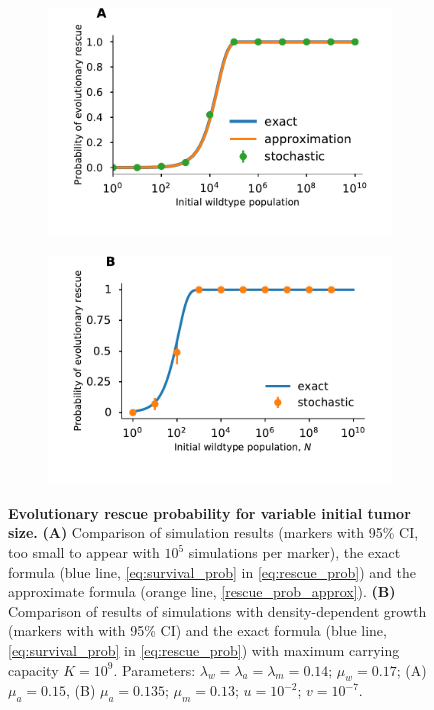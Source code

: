 \documentclass[12pt]{extarticle}
\begin{document}

\begin{figure}
\begin{subfigure}{0.5\textwidth}
\includegraphics[width=1\textwidth]{Figures/DeleteriousTauLeapPlot.pdf}
\end{subfigure}
\begin{subfigure}{0.5\textwidth}
\includegraphics[width=1\textwidth]{Figures/SurvPlotNDataLogisticK.pdf}
\end{subfigure}
\caption{\textbf{Evolutionary rescue probability for variable initial tumor size.}
\textbf{(A)} Comparison of simulation results (markers with 95\% CI, too small to appear with $10^5$ simulations per marker), the exact formula (blue line, \cref{eq:survival_prob} in \cref{eq:rescue_prob}) and the approximate formula (orange line, \cref{rescue_prob_approx}).
\textbf{(B)} Comparison of results of simulations  with density-dependent growth (markers with with 95\% CI) and the exact formula (blue line, \cref{eq:survival_prob} in \cref{eq:rescue_prob}) with maximum carrying capacity $K=10^9$.
Parameters: $\lambda_w=\lambda_a=\lambda_m=0.14$; $\mu_w=0.17$; (A) $\mu_a=0.15$, (B) $\mu_a=0.135$; $\mu_m=0.13$; $u=10^{-2}$; $v=10^{-7}$.
}
\label{rescue_prob_N}
\end{figure}
\end{document}
